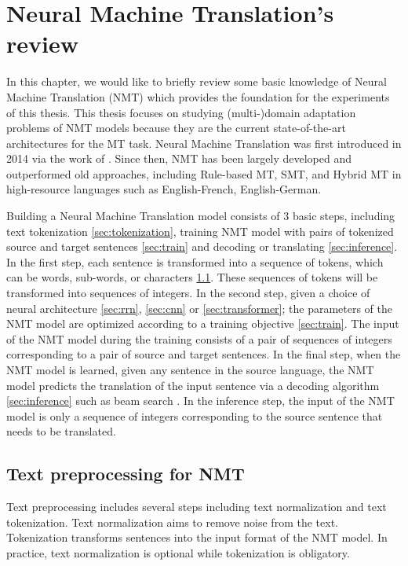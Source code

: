 \chapter{Neural Machine Translation’s review}
In this chapter, we would like to briefly review some basic knowledge of Neural Machine Translation (NMT) which provides the foundation for the experiments of this thesis. This thesis focuses on studying (multi-)domain adaptation problems of NMT models because they are the current state-of-the-art architectures for the MT task. Neural Machine Translation was first introduced in 2014 via the work of \cite{Bahdanau15learning,Cho14properties}. Since then, NMT has been largely developed and outperformed old approaches, including Rule-based MT, SMT, and Hybrid MT in high-resource languages such as English-French, English-German.

Building a Neural Machine Translation model consists of 3 basic steps, including text tokenization \ref{sec:tokenization}, training NMT model with pairs of tokenized source and target sentences \ref{sec:train} and decoding or translating \ref{sec:inference}. In the first step, each sentence is transformed into a sequence of tokens, which can be words, sub-words, or characters \ref{sec:preprocessing}. These sequences of tokens will be transformed into sequences of integers. In the second step, given a choice of neural architecture \ref{sec:rrn}, \ref{sec:cnn} or \ref{sec:transformer}; the parameters of the NMT model are optimized according to a training objective \ref{sec:train}. The input of the NMT model during the training consists of a pair of sequences of integers corresponding to a pair of source and target sentences. In the final step, when the NMT model is learned, given any sentence in the source language, the NMT model predicts the translation of the input sentence via a decoding algorithm \ref{sec:inference} such as beam search \citep{Koehn04pharaoh}. In the inference step, the input of the NMT model is only a sequence of integers corresponding to the source sentence that needs to be translated.

\section{Text preprocessing for NMT \label{sec:tokenization}} \label{sec:preprocessing}
Text preprocessing includes several steps including text normalization and text tokenization. Text normalization aims to remove noise from the text. Tokenization transforms sentences into the input format of the NMT model. In practice, text normalization is optional while tokenization is obligatory.

